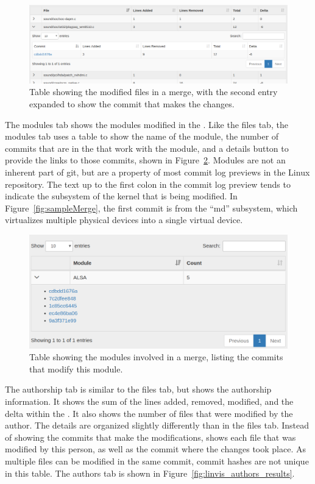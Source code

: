 \begin{figure}[htpb]
  \centering
  \includegraphics[width=0.9\linewidth]{Figures/Linvis/linvis_files.png}
  \caption{Table showing the modified files in a merge, with the second
    entry expanded to show the commit that makes the changes.}
  \label{fig:linvis_files_results}
\end{figure}

The modules tab shows the modules modified in the \mt{}. Like the files
tab, the modules tab uses a table to show the name of the module, the
number of commits that are in the \mt{} that work with the module, and a
details button to provide the links to those commits, shown in
Figure~\ref{fig:linvis_modules_results}. Modules are not an inherent
part of git, but are a property of most commit log previews in the Linux
repository. The text up to the first colon in the commit log preview
tends to indicate the subsystem of the kernel that is being modified. In
Figure~\ref{fig:sampleMerge}, the first commit is from the ``md''
subsystem, which virtualizes multiple physical devices into a single
virtual device.

\begin{figure}[htpb]
  \centering
  \includegraphics[width=0.9\linewidth]{Figures/Linvis/linvis_modules.png}
  \caption{Table showing the modules involved in a merge, listing the
    commits that modify this module.}
  \label{fig:linvis_modules_results}
\end{figure}

The authorship tab is similar to the files tab,
but shows the authorship information.
It shows the sum of the lines added, removed, modified, and the delta
within the \mt{}.
It also shows the number of files that were modified by the author.
The details are organized slightly differently than in the files tab.
Instead of showing the commits that make the modifications, \tool{}
shows each file that was modified by this person, as well as the commit
where the changes took place.
As multiple files can be modified in the same commit,
commit hashes are not unique in this table.
The authors tab is shown in Figure~\ref{fig:linvis_authors_results}.


